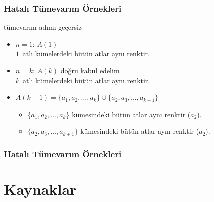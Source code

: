 \documentclass[dvipsnames]{beamer}
\theoremstyle{definition}
\theoremstyle{example}
\theoremstyle{plain}
\begin{document}
\begin{frame}
  \frametitle{Hatalı Tümevarım Örnekleri}

  \begin{block}{tümevarım adımı geçersiz}
    \begin{itemize}
      \item $n=1$: $A(1)$\\
        $1$~atlı kümelerdeki bütün atlar aynı renktir.

      \pause
      \medskip
      \item $n=k$: $A(k)$ doğru kabul edelim\\
        $k$~atlı kümelerdeki bütün atlar aynı renktir.

      \pause
      \medskip
      \item $A(k+1)=\{a_1,a_2,\dots,a_k\} \cup \{a_2,a_3,\dots,a_{k+1}\}$
      \begin{itemize}
        \item $\{a_1,a_2,\dots,a_k\}$ kümesindeki bütün atlar
          aynı renktir ($a_2$).
        \item $\{a_2,a_3,\dots,a_{k+1}\}$ kümesindeki bütün atlar
          aynı renktir ($a_2$).
      \end{itemize}
    \end{itemize}
  \end{block}
\end{frame}

\begin{frame}
  \frametitle{Hatalı Tümevarım Örnekleri}

  \begin{center}
  \end{center}
\end{frame}

\section*{Kaynaklar}
\end{document}

